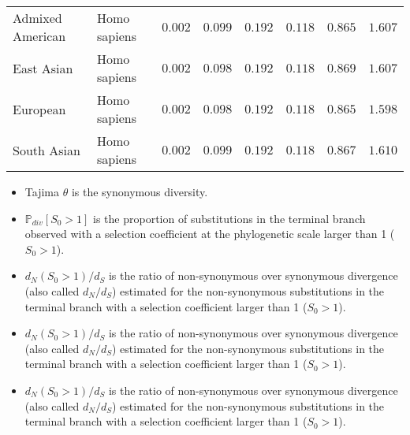 \documentclass{article}
\newcommand{\dn}{d_N}
\newcommand{\ds}{d_S}
\newcommand{\dnds}{\dn / \ds}
\newcommand{\Sphy}{S_{0}}
\begin{document}
\begin{center}
\begin{longtable*}{|l|l|r|r|r|r|r|r|}
            Admixed American &        Homo sapiens &               $ 0.002$ &                      $ 0.099$ &  $ 0.192$ &             $ 0.118$ &             $ 0.865$ &             $ 1.607$ \\
            East Asian &        Homo sapiens &               $ 0.002$ &                      $ 0.098$ &  $ 0.192$ &             $ 0.118$ &             $ 0.869$ &             $ 1.607$ \\
            European &        Homo sapiens &               $ 0.002$ &                      $ 0.098$ &  $ 0.192$ &             $ 0.118$ &             $ 0.865$ &             $ 1.598$ \\
            South Asian &        Homo sapiens &               $ 0.002$ &                      $ 0.099$ &  $ 0.192$ &             $ 0.118$ &             $ 0.867$ &             $ 1.610$ \\
        \end{longtable*}
    \end{center}
    \begin{itemize}
        \item Tajima $\theta$ is the synonymous diversity.
        \item $\mathbb{P}_{div}[\Sphy > 1]$ is the proportion of substitutions in the terminal branch observed with a selection coefficient at the phylogenetic scale larger than 1 ($\Sphy > 1$).
        \item $\dn(\Sphy > 1) / \ds$ is the ratio of non-synonymous over synonymous divergence (also called $\dnds$) estimated for the non-synonymous substitutions in the terminal branch with a selection coefficient larger than 1 ($\Sphy > 1$).
        \item $\dn(\Sphy > 1) / \ds$ is the ratio of non-synonymous over synonymous divergence (also called $\dnds$) estimated for the non-synonymous substitutions in the terminal branch with a selection coefficient larger than 1 ($\Sphy > 1$).
        \item $\dn(\Sphy > 1) / \ds$ is the ratio of non-synonymous over synonymous divergence (also called $\dnds$) estimated for the non-synonymous substitutions in the terminal branch with a selection coefficient larger than 1 ($\Sphy > 1$).
    \end{itemize}
\end{document}
